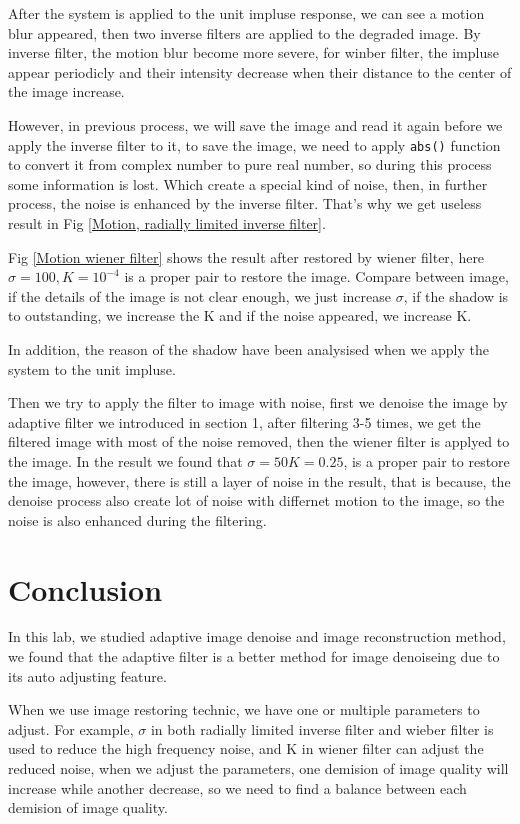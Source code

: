\documentclass[
	12pt, %
]{style/fphw}
\begin{document}
After the system is applied to the unit impluse response, we can see a motion blur appeared, then two inverse filters are applied to the degraded image. By inverse filter, the motion blur become more severe, for winber filter, the impluse appear periodicly and their intensity decrease when their distance to the center of the image increase.

However, in previous process, we will save the image and read it again before we apply the inverse filter to it, to save the image, we need to apply \texttt{abs()} function to convert it from complex number to pure real number, so during this process some information is lost. Which create a special kind of noise, then, in further process, the noise is enhanced by the inverse filter. That's why we get useless result in Fig \ref{Motion, radially limited inverse filter}.

Fig \ref{Motion wiener filter} shows the result after restored by wiener filter, here $\sigma = 100, K = 10^{-4}$ is a proper pair to restore the image. Compare between image, if the details of the image is not clear enough, we just increase $\sigma$, if the shadow is to outstanding, we increase the K and if the noise appeared, we increase K.

In addition, the reason of the shadow have been analysised when we apply the system to the unit impluse.

Then we try to apply the filter to image with noise, first we denoise the image by adaptive filter we introduced in section 1, after filtering 3-5 times, we get the filtered image with most of the noise removed, then the wiener filter is applyed to the image. In the result we found that $\sigma =50 K =0.25$, is a proper pair to restore the image, however, there is still a layer of noise in the result, that is because, the denoise process also create lot of noise with differnet motion to the image, so the noise is also enhanced during the filtering.


\section*{Conclusion}

In this lab, we studied adaptive image denoise and image reconstruction method, we found that the adaptive filter is a better method for image denoiseing due to its auto adjusting feature. 

When we use image restoring technic, we have one or multiple parameters to adjust. For example, $\sigma$ in both radially limited inverse filter and wieber filter is used to reduce the high frequency noise, and K in wiener filter can adjust the reduced noise, when we adjust the parameters, one demision of image quality will increase while another decrease, so we need to find a balance between each demision of image quality.
\end{document}
